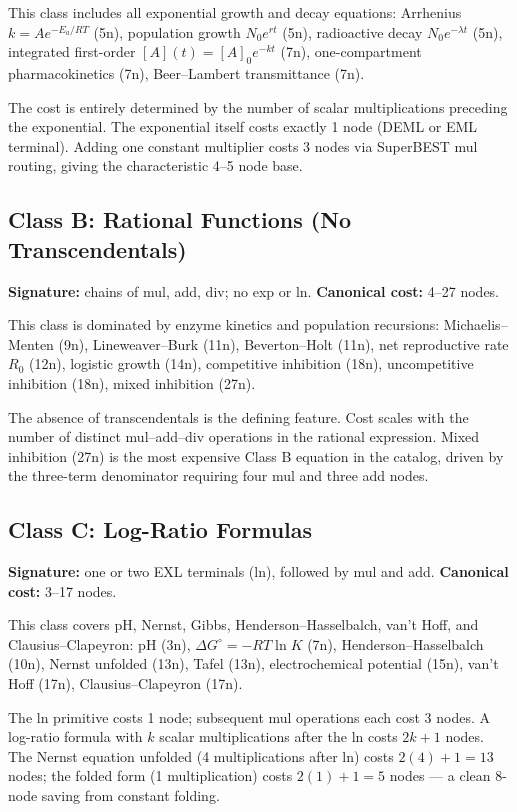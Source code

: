 \documentclass[12pt,a4paper]{article}
\theoremstyle{definition}
\begin{document}
This class includes all exponential growth and decay equations:
Arrhenius $k = A e^{-E_a/RT}$ (5n),
population growth $N_0 e^{rt}$ (5n),
radioactive decay $N_0 e^{-\lambda t}$ (5n),
integrated first-order $[A](t) = [A]_0 e^{-kt}$ (7n),
one-compartment pharmacokinetics (7n), Beer--Lambert transmittance (7n).

The cost is entirely determined by the number of scalar multiplications
preceding the exponential.  The exponential itself costs exactly 1 node
(DEML or EML terminal).  Adding one constant multiplier costs 3 nodes via
SuperBEST mul routing, giving the characteristic 4--5 node base.

\subsection{Class B: Rational Functions (No Transcendentals)}

\textbf{Signature:} chains of mul, add, div; no exp or ln.
\textbf{Canonical cost:} 4--27 nodes.

This class is dominated by enzyme kinetics and population recursions:
Michaelis--Menten (9n), Lineweaver--Burk (11n), Beverton--Holt (11n),
net reproductive rate $R_0$ (12n), logistic growth (14n),
competitive inhibition (18n), uncompetitive inhibition (18n),
mixed inhibition (27n).

The absence of transcendentals is the defining feature.  Cost scales with
the number of distinct mul--add--div operations in the rational expression.
Mixed inhibition (27n) is the most expensive Class B equation in the catalog,
driven by the three-term denominator requiring four mul and three add nodes.

\subsection{Class C: Log-Ratio Formulas}

\textbf{Signature:} one or two EXL terminals (ln), followed by mul and add.
\textbf{Canonical cost:} 3--17 nodes.

This class covers pH, Nernst, Gibbs, Henderson--Hasselbalch, van't Hoff,
and Clausius--Clapeyron:
pH (3n), $\Delta G^\circ = -RT\ln K$ (7n),
Henderson--Hasselbalch (10n), Nernst unfolded (13n), Tafel (13n),
electrochemical potential (15n), van't Hoff (17n), Clausius--Clapeyron (17n).

The ln primitive costs 1 node; subsequent mul operations each cost 3 nodes.
A log-ratio formula with $k$ scalar multiplications after the ln costs
$2k + 1$ nodes.  The Nernst equation unfolded (4 multiplications after ln)
costs $2(4)+1 = 13$ nodes; the folded form (1 multiplication) costs
$2(1)+1 = 5$ nodes --- a clean 8-node saving from constant folding.
\end{document}
